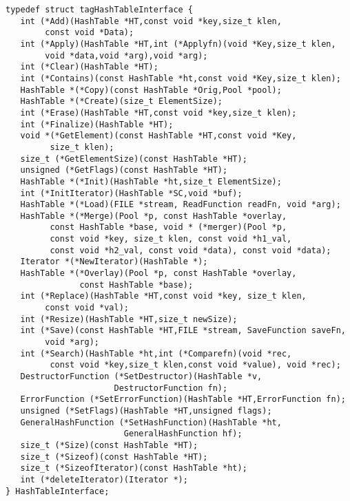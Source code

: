 \begin{verbatim}
typedef struct tagHashTableInterface {
   int (*Add)(HashTable *HT,const void *key,size_t klen,
        const void *Data);
   int (*Apply)(HashTable *HT,int (*Applyfn)(void *Key,size_t klen,
        void *data,void *arg),void *arg);
   int (*Clear)(HashTable *HT);
   int (*Contains)(const HashTable *ht,const void *Key,size_t klen);
   HashTable *(*Copy)(const HashTable *Orig,Pool *pool);
   HashTable *(*Create)(size_t ElementSize);
   int (*Erase)(HashTable *HT,const void *key,size_t klen);
   int (*Finalize)(HashTable *HT);
   void *(*GetElement)(const HashTable *HT,const void *Key,
         size_t klen);
   size_t (*GetElementSize)(const HashTable *HT);
   unsigned (*GetFlags)(const HashTable *HT);
   HashTable *(*Init)(HashTable *ht,size_t ElementSize);
   int (*InitIterator)(HashTable *SC,void *buf);
   HashTable *(*Load)(FILE *stream, ReadFunction readFn, void *arg);
   HashTable *(*Merge)(Pool *p, const HashTable *overlay,
         const HashTable *base, void * (*merger)(Pool *p,
         const void *key, size_t klen, const void *h1_val,
         const void *h2_val, const void *data), const void *data);
   Iterator *(*NewIterator)(HashTable *);
   HashTable *(*Overlay)(Pool *p, const HashTable *overlay,
               const HashTable *base);
   int (*Replace)(HashTable *HT,const void *key, size_t klen,
        const void *val);
   int (*Resize)(HashTable *HT,size_t newSize);
   int (*Save)(const HashTable *HT,FILE *stream, SaveFunction saveFn,
        void *arg);
   int (*Search)(HashTable *ht,int (*Comparefn)(void *rec,
         const void *key,size_t klen,const void *value), void *rec);
   DestructorFunction (*SetDestructor)(HashTable *v,
                      DestructorFunction fn);
   ErrorFunction (*SetErrorFunction)(HashTable *HT,ErrorFunction fn);
   unsigned (*SetFlags)(HashTable *HT,unsigned flags);
   GeneralHashFunction (*SetHashFunction)(HashTable *ht,
                        GeneralHashFunction hf);
   size_t (*Size)(const HashTable *HT);
   size_t (*Sizeof)(const HashTable *HT);
   size_t (*SizeofIterator)(const HashTable *ht);
   int (*deleteIterator)(Iterator *);
} HashTableInterface;
\end{verbatim}
